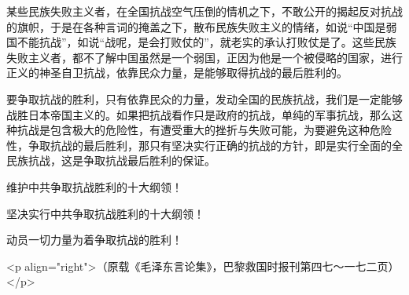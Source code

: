 某些民族失败主义者，在全国抗战空气压倒的情机之下，不敢公开的揭起反对抗战的旗帜，于是在各种言词的掩盖之下，散布民族失败主义的情绪，如说“中国是弱国不能抗战”，如说“战呢，是会打败仗的”，就老实的承认打败仗是了。这些民族失败主义者，都不了解中国虽然是一个弱国，正因为他是一个被侵略的国家，进行正义的神圣自卫抗战，依靠民众力量，是能够取得抗战的最后胜利的。

要争取抗战的胜利，只有依靠民众的力量，发动全国的民族抗战，我们是一定能够战胜日本帝国主义的。如果把抗战看作只是政府的抗战，单纯的军事抗战，那么这种抗战是包含极大的危险性，有遭受重大的挫折与失败可能，为要避免这种危险性，争取抗战的最后胜利，那只有坚决实行正确的抗战的方针，即是实行全面的全民族抗战，这是争取抗战最后胜利的保证。

维护中共争取抗战胜利的十大纲领！

坚决实行中共争取抗战胜利的十大纲领！

动员一切力量为着争取抗战的胜利！

<p align="right">（原载《毛泽东言论集》，巴黎救国时报刊第四七～一七二页）</p>

